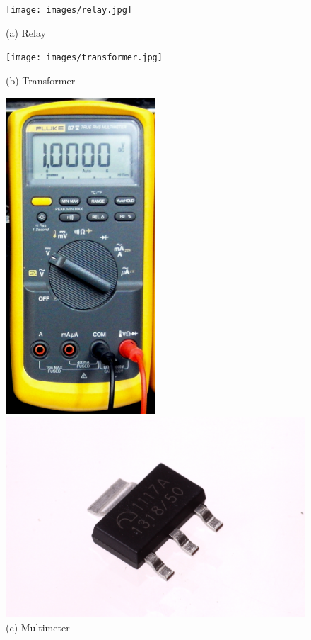 \begin{figure}[h]
    \centering
    \begin{minipage}{0.24\textwidth}
        \texttt{[image: images/relay.jpg]}
        \caption*{(a) Relay}
    \end{minipage}%
    \hfill%
    \begin{minipage}{0.24\textwidth}
        \texttt{[image: images/transformer.jpg]}
        \caption*{(b) Transformer}
    \end{minipage}%
    \hfill%
    \begin{minipage}{0.24\textwidth}
        \centering
        \includegraphics[width=0.5\textwidth]{images/multimeter.jpg}
        \caption*{(c) Multimeter}
    \end{minipage}%
    \hfill%
    \begin{minipage}{0.24\textwidth}
        \includegraphics[width=\textwidth]{images/regulator.jpg}

\end{minipage}
\end{figure}
